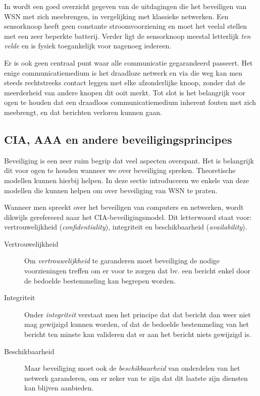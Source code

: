 In \citep{dargie2010fundamentals} wordt een goed overzicht gegeven van de
uitdagingen die het beveiligen van WSN met zich meebrengen, in vergelijking met
klassieke netwerken. Een sensorknoop heeft geen constante stroomvoorziening en
moet het veelal stellen met een zeer beperkte batterij. Verder ligt de
sensorknoop meestal letterlijk \emph{ten velde} en is fysiek toegankelijk voor
nagenoeg iedereen.

Er is ook geen centraal punt waar alle communicatie gegarandeerd passeert. Het
enige communicatiemedium is het draadloze netwerk en via die weg kan men steeds
rechtstreeks contact leggen met elke afzonderlijke knoop, zonder dat de
meerderheid van andere knopen dit ooit merkt. Tot slot is het belangrijk voor
ogen te houden dat een draadloos communicatiemedium inherent fouten met zich
meebrengt, en dat berichten verloren kunnen gaan.

\subsection{CIA, AAA en andere beveiligingsprincipes}
\label{subsection:cia}

Beveiliging is een zeer ruim begrip dat veel aspecten overspant. Het is
belangrijk dit voor ogen te houden wanneer we over beveiliging spreken.
Theoretische modellen kunnen hierbij helpen. In deze sectie introduceren we
enkele van deze modellen die kunnen helpen om over beveiliging van WSN te
praten.

Wanneer men spreekt over het beveiligen van computers en netwerken, wordt
dikwijls gerefereerd naar het CIA-beveiligingsmodel. Dit letterwoord staat
voor: vertrouwelijkheid (\emph{confidentiality}), integriteit en
beschikbaarheid (\emph{availability}).

\begin{description}

  \item[Vertrouwelijkheid] Om \emph{vertrouwelijkheid} te garanderen moet
  beveiliging de nodige voorzieningen treffen om er voor te zorgen dat bv. een
  bericht enkel door de bedoelde bestemmeling kan begrepen worden.
  
  \item[Integriteit] Onder \emph{integriteit} verstaat men het principe dat dat
  bericht dan weer niet mag gewijzigd kunnen worden, of dat de bedoelde
  bestemmeling van het bericht ten minste kan valideren dat er aan het bericht
  niets gewijzigd is. 
  
  \item[Beschikbaarheid] Maar beveiliging moet ook de \emph{beschikbaarheid}
  van onderdelen van het netwerk garanderen, om er zeker van te zijn dat dit
  laatste zijn diensten kan blijven aanbieden.

\end{description}


